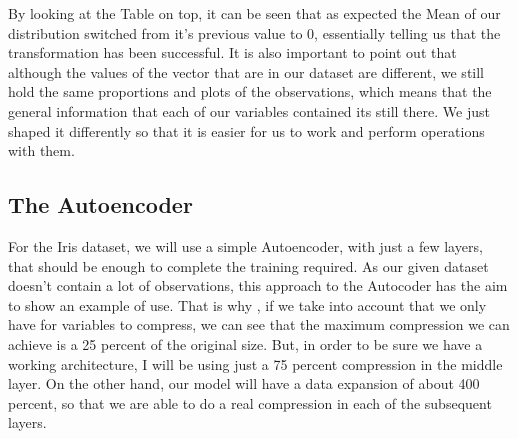 By looking at the Table on top, it can be seen that as expected the Mean of our distribution switched from it's previous value to 0, essentially telling us that the transformation has been successful. It is also important to point out that although the values of the vector that are in our dataset are different, we still hold the same proportions and plots of the observations, which means that the general information that each of our variables contained its still there. We just shaped it differently so that it is easier for us to work and perform operations with them.

\subsection{The Autoencoder}

For the Iris dataset, we will use a simple Autoencoder, with just a few layers, that should be enough to complete the training required. As our given dataset doesn't contain a lot of observations, this approach to the Autocoder has the aim to show an example of use. That is why , if we take into account that we only have for variables to compress, we can see that the maximum compression we can achieve is a 25 percent of the original size. But, in order to be sure we have a working architecture, I will be using just a 75 percent compression in the middle layer. On the other hand, our model will have a data expansion of about 400 percent, so that we are able to do a real compression in each of the subsequent layers. \par


